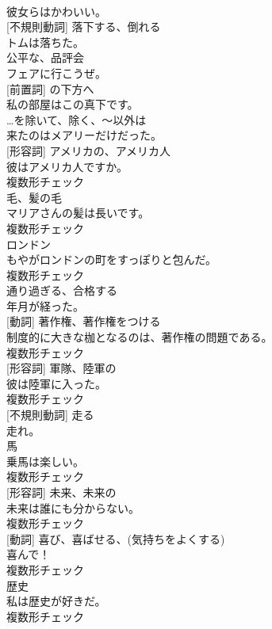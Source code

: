 \documentclass[8pt]{extreport}
\begin{document}
\begin{CJK}{UTF8}{min}
\\	彼女らはかわいい。	
\\	[動詞] [不規則動詞]	落下する、倒れる	
\\	トムは落ちた。	
\\	[形容詞]	公平な、品評会	
\\	フェアに行こうぜ。	
\\	[副詞] [前置詞]	の下方へ	
\\	私の部屋はこの真下です。	
\\	[前置詞]	…を除いて、除く、〜以外は	
\\	来たのはメアリーだけだった。	
\\	[名詞] [形容詞]	アメリカの、アメリカ人	
\\	彼はアメリカ人ですか。	
\\	複数形チェック
\\	[名詞]	毛、髪の毛	
\\	マリアさんの髪は長いです。	
\\	複数形チェック
\\	[名詞]	ロンドン	
\\	もやがロンドンの町をすっぽりと包んだ。	
\\	複数形チェック
\\	[動詞]	通り過ぎる、合格する	
\\	年月が経った。	
\\	[名詞] [動詞]	著作権、著作権をつける	
\\	制度的に大きな枷となるのは、著作権の問題である。	
\\	複数形チェック
\\	[名詞] [形容詞]	軍隊、陸軍の	
\\	彼は陸軍に入った。	
\\	複数形チェック
\\	[動詞] [不規則動詞]	走る	
\\	走れ。	
\\	[名詞]	馬	
\\	乗馬は楽しい。	
\\	複数形チェック
\\	[名詞] [形容詞]	未来、未来の	
\\	未来は誰にも分からない。	
\\	複数形チェック
\\	[名詞] [動詞]	喜び、喜ばせる、(気持ちをよくする)	
\\	喜んで！	
\\	複数形チェック
\\	[名詞]	歴史	
\\	私は歴史が好きだ。	
\\	複数形チェック

\end{CJK}
\end{document}
